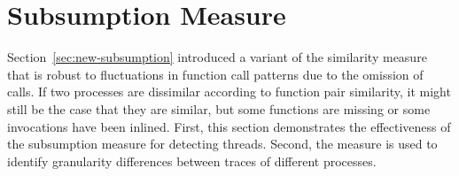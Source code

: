 \documentclass[a4paper, final, diplominf]{zih-template}
\begin{document}
\section{Subsumption Measure}
\label{sec:evaluation-subsumption}
Section~\ref{sec:new-subsumption} introduced a variant of the similarity measure that is robust to fluctuations in function call patterns due to the omission of calls.
If two processes are dissimilar according to function pair similarity, it might still be the case that they are similar, but some functions are missing or some invocations have been inlined.
First, this section demonstrates the effectiveness of the subsumption measure for detecting threads.
Second, the measure is used to identify granularity differences between traces of different processes.
\end{document}
